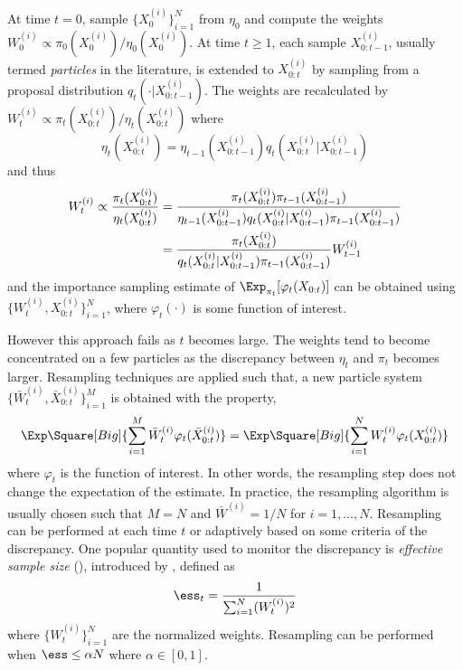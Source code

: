 At time $t = 0$, sample $\{X_0^{(i)}\}_{i=1}^N$ from $\eta_0$ and compute the
weights $W_0^{(i)} \propto \pi_0(X_0^{(i)})/\eta_0(X_0^{(i)})$. At time
$t\ge1$, each sample $X_{0:t-1}^{(i)}$, usually termed \emph{particles} in the
literature, is extended to $X_{0:t}^{(i)}$ by sampling from a proposal
distribution $q_t(\cdot|X_{0:t-1}^{(i)})$. The weights are recalculated by
$W_t^{(i)} \propto \pi_t(X_{0:t}^{(i)})/\eta_t(X_{0:t}^{(i)})$ where
\begin{equation}
  \eta_t(X_{0:t}^{(i)}) =
  \eta_{t-1}(X_{0:t-1}^{(i)})q_t(X_{0:t}^{(i)}|X_{0:t-1}^{(i)})
\end{equation}
and thus
\begin{align}
  W_t^{(i)} \propto \frac{\pi_t(X_{0:t}^{(i)})}{\eta_t(X_{0:t}^{(i)})}
  &= \frac{\pi_t(X_{0:t}^{(i)})\pi_{t-1}(X_{0:t-1}^{(i)})}
  {\eta_{t-1}(X_{0:t-1}^{(i)})q_t(X_{0:t}^{(i)}|X_{0:t-1}^{(i)})
    \pi_{t-1}(X_{0:t-1}^{(i)})} \notag\\
  &= \frac{\pi_t(X_{0:t}^{(i)})}
  {q_t(X_{0:t}^{(i)}|X_{0:t-1}^{(i)})\pi_{t-1}(X_{0:t-1}^{(i)})}W_{t-1}^{(i)}
  \label{eq:si}
\end{align}
and the importance sampling estimate of $\Exp_{\pi_t}[\varphi_t(X_{0:t})]$ can
be obtained using $\{W_t^{(i)},X_{0:t}^{(i)}\}_{i=1}^N$, where
$\varphi_t(\cdot)$ is some function of interest.

However this approach fails as $t$ becomes large. The weights tend to become
concentrated on a few particles as the discrepancy between $\eta_t$ and
$\pi_t$ becomes larger. Resampling techniques are applied such that, a new
particle system $\{\bar{W}_t^{(i)},\bar{X}_{0:t}^{(i)}\}_{i=1}^M$ is obtained
with the property,
\begin{equation}
  \Exp\Square[Big]{\sum_{i=1}^M\bar{W}_t^{(i)}\varphi_t(\bar{X}_{0:t}^{(i)})}
  = \Exp\Square[Big]{\sum_{i=1}^NW_t^{(i)}\varphi_t(X_{0:t}^{(i)})}
  \label{eq:resample}
\end{equation}
where $\varphi_t$ is the function of interest. In other words, the resampling
step does not change the expectation of the estimate. In practice, the
resampling algorithm is usually chosen such that $M = N$ and $\bar{W}^{(i)} =
1/N$ for $i=1,\dots,N$. Resampling can be performed at each time $t$ or
adaptively based on some criteria of the discrepancy. One popular quantity
used to monitor the discrepancy is \emph{effective sample size} (\ess),
introduced by \cite{Liu:1998iu}, defined as
\begin{equation}
  \ess_t = \frac{1}{\sum_{i=1}^N (W_t^{(i)})^2}
\end{equation}
where $\{W_t^{(i)}\}_{i=1}^N$ are the normalized weights. Resampling can be
performed when $\ess\le \alpha N$ where $\alpha\in[0,1]$.

